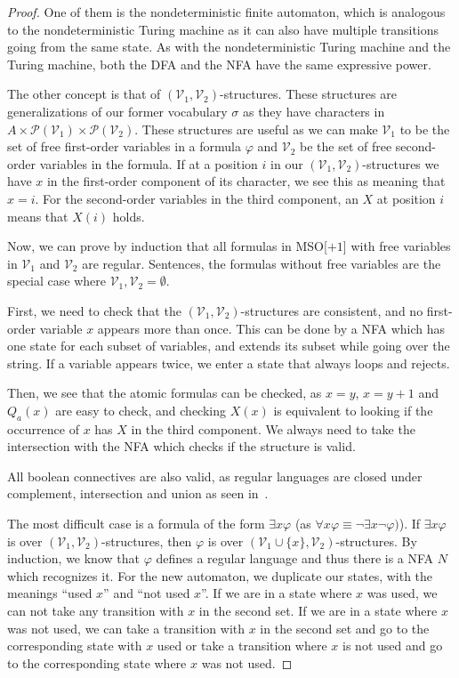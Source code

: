 \begin{proof}
    One of them is the nondeterministic finite automaton, which is analogous to the nondeterministic Turing machine as it can also have multiple transitions going from the same state.
    As with the nondeterministic Turing machine and the Turing machine, both the DFA and the NFA have the same expressive power.

    The other concept is that of $(\mathcal{V}_1, \mathcal{V}_2)$-structures.
    These structures are generalizations of our former vocabulary $\sigma$ as they have characters in $A \times \mathcal{P}(\mathcal{V}_1)\times \mathcal{P}(\mathcal{V}_2)$.
    These structures are useful as we can make $\mathcal{V}_1$ to be the set of free first-order variables in a formula $\varphi$ and $\mathcal{V}_2$ be the set of free second-order variables in the formula.
    If at a position $i$ in our $(\mathcal{V}_1, \mathcal{V}_2)$-structures we have $x$ in the first-order component of its character, we see this as meaning that $x = i$.
    For the second-order variables in the third component, an $X$ at position $i$ means that $X(i)$ holds.

    Now, we can prove by induction that all formulas in \acs{MSO}[$+1$] with free variables in $\mathcal{V}_1$ and $\mathcal{V}_2$ are regular.
    Sentences, the formulas without free variables are the special case where $\mathcal{V}_1, \mathcal{V}_2 = \emptyset$.

    First, we need to check that the $(\mathcal{V}_1, \mathcal{V}_2)$-structures are consistent, and no first-order variable $x$ appears more than once.
    This can be done by a NFA which has one state for each subset of variables, and extends its subset while going over the string.
    If a variable appears twice, we enter a state that always loops and rejects.

    Then, we see that the atomic formulas can be checked, as $x = y$, $x = y + 1$ and $Q_a(x)$ are easy to check, and checking $X(x)$ is equivalent to looking if the occurrence of $x$ has $X$ in the third component.
    We always need to take the intersection with the NFA which checks if the structure is valid.

    All boolean connectives are also valid, as regular languages are closed under complement, intersection and union as seen in~\cite{theory-cs}.

    The most difficult case is a formula of the form $\exists x \varphi$ (as $\forall x \varphi \equiv \neg \exists x \neg \varphi)$).
    If $\exists x \varphi$ is over $(\mathcal{V}_1, \mathcal{V}_2)$-structures, then $\varphi$ is over $(\mathcal{V}_1 \cup \{x\}, \mathcal{V}_2)$-structures.
    By induction, we know that $\varphi$ defines a regular language and thus there is a NFA $N$ which recognizes it.
    For the new automaton, we duplicate our states, with the meanings ``used $x$'' and ``not used $x$''.
    If we are in a state where $x$ was used, we can not take any transition with $x$ in the second set.
    If we are in a state where $x$ was not used, we can take a transition with $x$ in the second set and go to the corresponding state with $x$ used or take a transition where $x$ is not used and go to the corresponding state where $x$ was not used.


\end{proof}
